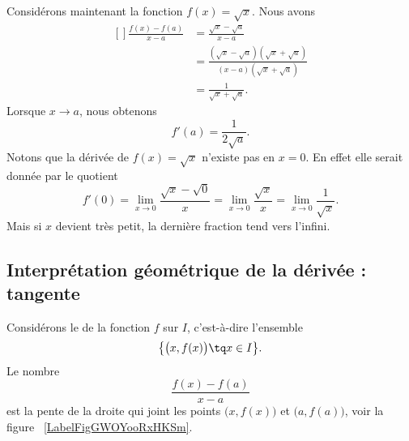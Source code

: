 Considérons maintenant la fonction \( f(x)=\sqrt{x}\). Nous avons
\begin{equation}
	\begin{aligned}[]
		\frac{ f(x)-f(a) }{ x-a } & =\frac{ \sqrt{x}-\sqrt{a} }{ x-a }                                           \\
		                          & =\frac{ (\sqrt{x}-\sqrt{a})(\sqrt{x}+\sqrt{a}) }{ (x-a)(\sqrt{x}+\sqrt{a}) } \\
		                          & =\frac{1}{ \sqrt{x}+\sqrt{a} }.
	\end{aligned}
\end{equation}
Lorsque \( x\to a\), nous obtenons
\begin{equation}
	f'(a)=\frac{1}{ 2\sqrt{a} }.
\end{equation}
Notons que la dérivée de \( f(x)=\sqrt{x}\) n'existe pas en \( x=0\). En effet elle serait donnée par le quotient
\begin{equation}
	f'(0)=\lim_{x\to 0} \frac{ \sqrt{x}-\sqrt{0} }{ x }=\lim_{x\to 0} \frac{ \sqrt{x} }{ x }=\lim_{x\to 0} \frac{1}{ \sqrt{x} }.
\end{equation}
Mais si \( x\) devient très petit, la dernière fraction tend vers l'infini.

\subsection[Interprétation géométrique : tangente]{Interprétation géométrique de la dérivée : tangente}

Considérons le  de la fonction \( f\) sur \( I\), c'est-à-dire l'ensemble
\begin{equation}
	\big\{ \big( x,f(x) \big)\tq x\in I \big\}.
\end{equation}
Le nombre
\begin{equation}
	\frac{ f(x)-f(a) }{ x-a }
\end{equation}
est la pente de la droite qui joint les points \( \big( x,f(x) \big)\) et \( \big( a,f(a) \big)\), voir la figure ~\ref{LabelFigGWOYooRxHKSm}. %
\newcommand{\CaptionFigGWOYooRxHKSm}{Le coefficient directeur de la corde entre \( a\) et \( x\).}


